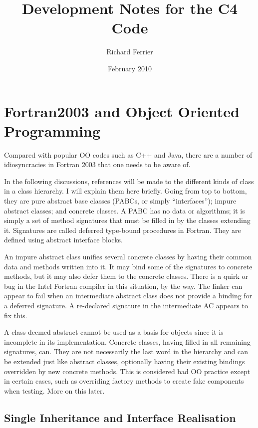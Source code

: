 \documentclass[dvips, 11pt, a4paper]{article}
\begin{document}
\title{Development Notes for the C4 Code} \author{Richard Ferrier}
\date{February 2010}

\maketitle

\section{Fortran2003 and Object Oriented Programming}
\label{sec:Fortran2003AndObjectOrientedProgramming}

Compared with popular OO codes such as C++ and Java, there are a
number of idiosyncracies in Fortran 2003 that one needs to be aware
of.

In the following discussions, references will be made to the different
kinds of class in a class hierarchy.  I will explain them here briefly. 
Going from top to bottom, they
are pure abstract base classes (PABCs, or simply ``interfaces''); impure
abstract classes; and concrete classes.  A PABC has no data or
algorithms; it is simply a set of method signatures that must be
filled in by the classes extending it.  Signatures are called deferred
type-bound procedures in Fortran.  They are defined using abstract
interface blocks.

An impure abstract class unifies several concrete classes by having
their common data and methods written into it.  It may bind some of
the signatures to concrete methods, but it may also defer them to the
concrete classes.  There is a quirk or bug in the Intel Fortran
compiler in this situation, by the way.  The linker can appear to
 fail when an intermediate
abstract class does not provide a binding for a deferred signature.  
A re-declared signature in the intermediate AC appears to fix
this.

A class deemed abstract cannot be used as a basis for
objects since it is incomplete in its implementation.  Concrete
classes, having filled in all remaining signatures, can.  They are not
necessarily the last word in the hierarchy and can be extended just
like abstract classes, optionally having their existing bindings
overridden by new concrete methods.  This is considered 
bad OO practice except in certain cases, such as overriding factory
methods to create fake components when testing.  More on this later.


\subsection{Single Inheritance and Interface Realisation}
\label{sec:SingleInheritanceAndInterfaceRealisation}
\end{document}
